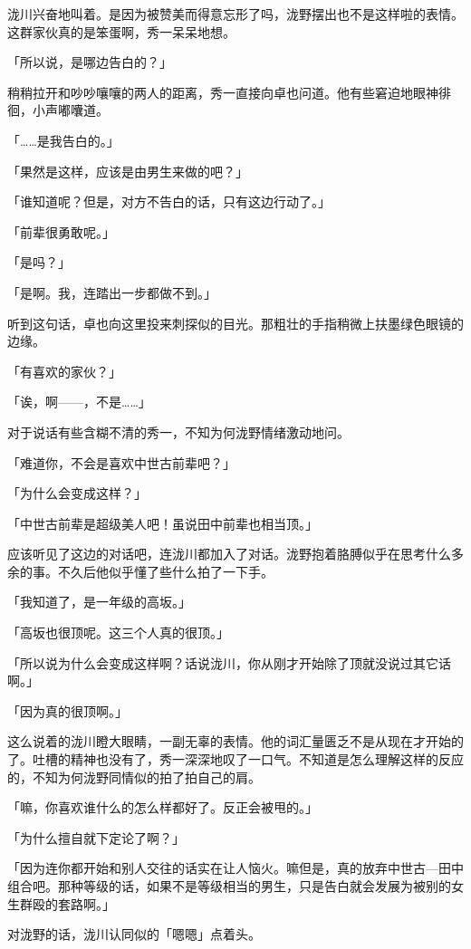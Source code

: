 \documentclass[UTF8]{ctexart}
\begin{document}
    泷川兴奋地叫着。是因为被赞美而得意忘形了吗，泷野摆出也不是这样啦的表情。这群家伙真的是笨蛋啊，秀一呆呆地想。

    「所以说，是哪边告白的？」

    稍稍拉开和吵吵嚷嚷的两人的距离，秀一直接向卓也问道。他有些窘迫地眼神徘徊，小声嘟囔道。

    「……是我告白的。」

    「果然是这样，应该是由男生来做的吧？」

    「谁知道呢？但是，对方不告白的话，只有这边行动了。」

    「前辈很勇敢呢。」

    「是吗？」

    「是啊。我，连踏出一步都做不到。」

    听到这句话，卓也向这里投来刺探似的目光。那粗壮的手指稍微上扶墨绿色眼镜的边缘。

    「有喜欢的家伙？」

    「诶，啊——，不是……」

    对于说话有些含糊不清的秀一，不知为何泷野情绪激动地问。

    「难道你，不会是喜欢中世古前辈吧？」

    「为什么会变成这样？」

    「中世古前辈是超级美人吧！虽说田中前辈也相当顶。」

    应该听见了这边的对话吧，连泷川都加入了对话。泷野抱着胳膊似乎在思考什么多余的事。不久后他似乎懂了些什么拍了一下手。

    「我知道了，是一年级的高坂。」

    「高坂也很顶呢。这三个人真的很顶。」

    「所以说为什么会变成这样啊？话说泷川，你从刚才开始除了顶就没说过其它话啊。」

    「因为真的很顶啊。」

    这么说着的泷川瞪大眼睛，一副无辜的表情。他的词汇量匮乏不是从现在才开始的了。吐槽的精神也没有了，秀一深深地叹了一口气。不知道是怎么理解这样的反应的，不知为何泷野同情似的拍了拍自己的肩。

    「嘛，你喜欢谁什么的怎么样都好了。反正会被甩的。」

    「为什么擅自就下定论了啊？」

    「因为连你都开始和别人交往的话实在让人恼火。嘛但是，真的放弃中世古—田中组合吧。那种等级的话，如果不是等级相当的男生，只是告白就会发展为被别的女生群殴的套路啊。」

    对泷野的话，泷川认同似的「嗯嗯」点着头。
\end{document}
